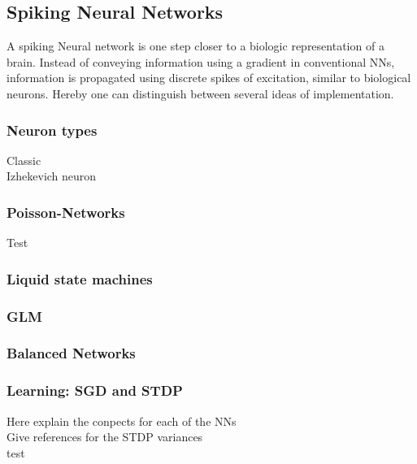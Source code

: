 \subsection{Spiking Neural Networks}
A spiking Neural network is one step closer to a biologic representation of a brain. Instead of conveying information using a gradient in conventional \ac{NN}s, information is propagated using discrete spikes of excitation, similar to biological neurons. Hereby one can distinguish between several ideas of implementation.


\subsubsection{Neuron types}
Classic\\
Izhekevich neuron\\

\subsubsection{Poisson-Networks}
Test
\subsubsection{Liquid state machines}

\subsubsection{GLM}

\subsubsection{Balanced Networks}

\subsubsection{Learning: SGD and STDP}
Here explain the conpects for each of the NNs\\
Give references for the STDP variances\\
test\\